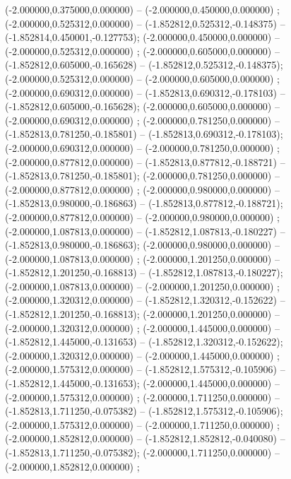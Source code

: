  (-2.000000,0.375000,0.000000) -- (-2.000000,0.450000,0.000000) ;
 (-2.000000,0.525312,0.000000) -- (-1.852812,0.525312,-0.148375) -- (-1.852814,0.450001,-0.127753);
 (-2.000000,0.450000,0.000000) -- (-2.000000,0.525312,0.000000) ;
 (-2.000000,0.605000,0.000000) -- (-1.852812,0.605000,-0.165628) -- (-1.852812,0.525312,-0.148375);
 (-2.000000,0.525312,0.000000) -- (-2.000000,0.605000,0.000000) ;
 (-2.000000,0.690312,0.000000) -- (-1.852813,0.690312,-0.178103) -- (-1.852812,0.605000,-0.165628);
 (-2.000000,0.605000,0.000000) -- (-2.000000,0.690312,0.000000) ;
 (-2.000000,0.781250,0.000000) -- (-1.852813,0.781250,-0.185801) -- (-1.852813,0.690312,-0.178103);
 (-2.000000,0.690312,0.000000) -- (-2.000000,0.781250,0.000000) ;
 (-2.000000,0.877812,0.000000) -- (-1.852813,0.877812,-0.188721) -- (-1.852813,0.781250,-0.185801);
 (-2.000000,0.781250,0.000000) -- (-2.000000,0.877812,0.000000) ;
 (-2.000000,0.980000,0.000000) -- (-1.852813,0.980000,-0.186863) -- (-1.852813,0.877812,-0.188721);
 (-2.000000,0.877812,0.000000) -- (-2.000000,0.980000,0.000000) ;
 (-2.000000,1.087813,0.000000) -- (-1.852812,1.087813,-0.180227) -- (-1.852813,0.980000,-0.186863);
 (-2.000000,0.980000,0.000000) -- (-2.000000,1.087813,0.000000) ;
 (-2.000000,1.201250,0.000000) -- (-1.852812,1.201250,-0.168813) -- (-1.852812,1.087813,-0.180227);
 (-2.000000,1.087813,0.000000) -- (-2.000000,1.201250,0.000000) ;
 (-2.000000,1.320312,0.000000) -- (-1.852812,1.320312,-0.152622) -- (-1.852812,1.201250,-0.168813);
 (-2.000000,1.201250,0.000000) -- (-2.000000,1.320312,0.000000) ;
 (-2.000000,1.445000,0.000000) -- (-1.852812,1.445000,-0.131653) -- (-1.852812,1.320312,-0.152622);
 (-2.000000,1.320312,0.000000) -- (-2.000000,1.445000,0.000000) ;
 (-2.000000,1.575312,0.000000) -- (-1.852812,1.575312,-0.105906) -- (-1.852812,1.445000,-0.131653);
 (-2.000000,1.445000,0.000000) -- (-2.000000,1.575312,0.000000) ;
 (-2.000000,1.711250,0.000000) -- (-1.852813,1.711250,-0.075382) -- (-1.852812,1.575312,-0.105906);
 (-2.000000,1.575312,0.000000) -- (-2.000000,1.711250,0.000000) ;
 (-2.000000,1.852812,0.000000) -- (-1.852812,1.852812,-0.040080) -- (-1.852813,1.711250,-0.075382);
 (-2.000000,1.711250,0.000000) -- (-2.000000,1.852812,0.000000) ;
